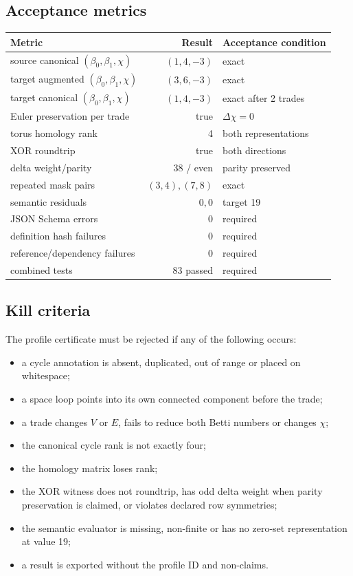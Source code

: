 \documentclass[10pt,a4paper]{article}
\newcommand{\bettiZero}{\beta_0}
\newcommand{\bettiOne}{\beta_1}
\begin{document}
\subsection{Acceptance metrics}
\begin{metricbox}
\begin{tabularx}{\textwidth}{XrX}
\toprule
\textbf{Metric} & \textbf{Result} & \textbf{Acceptance condition}\\
\midrule
source canonical $(\bettiZero,\bettiOne,\chi)$ & $(1,4,-3)$ & exact\\
target augmented $(\bettiZero,\bettiOne,\chi)$ & $(3,6,-3)$ & exact\\
target canonical $(\bettiZero,\bettiOne,\chi)$ & $(1,4,-3)$ & exact after 2 trades\\
Euler preservation per trade & true & $\Delta\chi=0$\\
torus homology rank & 4 & both representations\\
XOR roundtrip & true & both directions\\
delta weight/parity & 38 / even & parity preserved\\
repeated mask pairs & $(3,4),(7,8)$ & exact\\
semantic residuals & $0,0$ & target 19\\
JSON Schema errors & 0 & required\\
definition hash failures & 0 & required\\
reference/dependency failures & 0 & required\\
combined tests & 83 passed & required\\
\bottomrule
\end{tabularx}
\end{metricbox}

\subsection{Kill criteria}
The profile certificate must be rejected if any of the following occurs:
\begin{itemize}
\item a cycle annotation is absent, duplicated, out of range or placed on whitespace;
\item a space loop points into its own connected component before the trade;
\item a trade changes $V$ or $E$, fails to reduce both Betti numbers or changes $\chi$;
\item the canonical cycle rank is not exactly four;
\item the homology matrix loses rank;
\item the XOR witness does not roundtrip, has odd delta weight when parity preservation is claimed, or violates declared row symmetries;
\item the semantic evaluator is missing, non-finite or has no zero-set representation at value 19;
\item a result is exported without the profile ID and non-claims.
\end{itemize}
\end{document}
